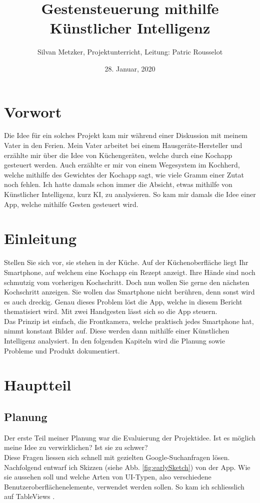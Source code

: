 \documentclass[12pt]{article}
\begin{document}
\title{Gestensteuerung mithilfe Künstlicher Intelligenz}
\date{28. Januar, 2020}
\author{Silvan Metzker, Projektunterricht, Leitung: Patric Rousselot}
\maketitle
\newpage
\tableofcontents
\newpage

\section{Vorwort}
Die Idee für ein solches Projekt kam mir während einer Diskussion mit meinem Vater in den Ferien. Mein Vater arbeitet bei einem Hausgeräte-Hersteller und erzählte mir über die Idee von Küchengeräten, welche durch eine Kochapp gesteuert werden. Auch erzählte er mir von einem Wegesystem im Kochherd, welche mithilfe des Gewichtes der Kochapp sagt, wie viele Gramm einer Zutat noch fehlen. Ich hatte damals schon immer die Absicht, etwas mithilfe von Künstlicher Intelligenz, kurz KI, zu analysieren. So kam mir damals die Idee einer App, welche mithilfe Gesten gesteuert wird.

\section{Einleitung}
Stellen Sie sich vor, sie stehen in der Küche. Auf der Küchenoberfläche liegt Ihr Smartphone, auf welchem eine Kochapp ein Rezept anzeigt. Ihre Hände sind noch schmutzig vom vorherigen Kochschritt. Doch nun wollen Sie gerne den nächsten Kochschritt anzeigen. Sie wollen das Smartphone nicht berühren, denn sonst wird es auch dreckig. Genau dieses Problem löst die App, welche in diesem Bericht thematisiert wird. Mit zwei Handgesten lässt sich so die App steuern.\\ Das Prinzip ist einfach, die Frontkamera, welche praktisch jedes Smartphone hat, nimmt konstant Bilder auf. Diese werden dann mithilfe einer Künstlichen Intelligenz analysiert. In den folgenden Kapiteln wird die Planung sowie Probleme und Produkt dokumentiert.


\section{Hauptteil}
\subsection{Planung}
Der erste Teil meiner Planung war die Evaluierung der Projektidee. Ist es möglich meine Idee zu verwirklichen? Ist sie zu schwer? \\ Diese Fragen liessen sich schnell mit gezielten Google-Suchanfragen lösen. \\ Nachfolgend entwarf ich Skizzen (siehe Abb. \ref{fig:earlySketch}) von der App. Wie sie aussehen soll und welche Arten von UI-Typen, also verschiedene Benutzeroberflächenelemente, verwendet werden sollen. So kam ich schliesslich auf TableViews \cite{tableviewvideo}.
\end{document}

